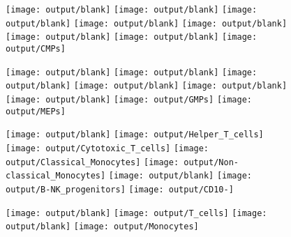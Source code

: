 \documentclass[11pt]{article}
\begin{document}
\begin{figure}[htbp]
  \centering
  \begin{minipage}[t]{0.125\textwidth}
    \texttt{[image: output/blank]}
    \texttt{[image: output/blank]}
    \texttt{[image: output/blank]}
    \texttt{[image: output/blank]}
    \texttt{[image: output/blank]}
    \texttt{[image: output/blank]}
    \texttt{[image: output/blank]}
    \texttt{[image: output/CMPs]}
  \end{minipage}%
  \begin{minipage}[t]{0.125\textwidth}
    \vspace{-0.5\linewidth} %
    \texttt{[image: output/blank]}
    \texttt{[image: output/blank]}
    \texttt{[image: output/blank]}
    \texttt{[image: output/blank]}
    \texttt{[image: output/blank]}
    \texttt{[image: output/blank]}
    \texttt{[image: output/GMPs]}
    \texttt{[image: output/MEPs]}
  \end{minipage}%
  \begin{minipage}[t]{0.125\textwidth}
    \centering
    \texttt{[image: output/blank]}
    \texttt{[image: output/Helper\_T\_cells]}
    \texttt{[image: output/Cytotoxic\_T\_cells]}
    \texttt{[image: output/Classical\_Monocytes]}
    \texttt{[image: output/Non-classical\_Monocytes]}
    \texttt{[image: output/blank]}
    \texttt{[image: output/B-NK\_progenitors]}
    \texttt{[image: output/CD10-]}
  \end{minipage}%
  \begin{minipage}[t]{0.125\textwidth}
    \centering
    \vspace{-0.5\linewidth} %
    \texttt{[image: output/blank]}
    \texttt{[image: output/T\_cells]}
    \texttt{[image: output/blank]}
    \texttt{[image: output/Monocytes]}

\end{minipage}
\end{figure}
\end{document}
